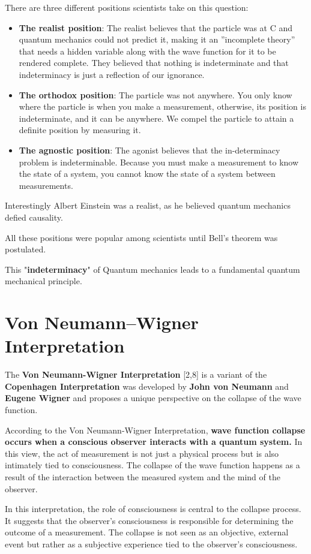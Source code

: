 \documentclass{article}
\begin{document}
There are three different positions scientists take on this question:
\begin{itemize}
\item \textbf{The realist position}: The realist believes that the particle was at C and quantum mechanics could not predict it, making it an ”incomplete theory” that needs a hidden variable along with the wave function for it to be rendered complete. They believed that nothing is indeterminate and that indeterminacy is just a reflection of our ignorance. 
\item \textbf{The orthodox position}: The particle was not anywhere. You only know where the particle is when you make a measurement, otherwise, its position is indeterminate, and it can be anywhere. We compel the particle to attain a definite position by measuring it. 
\item \textbf{The agnostic position}: The agonist believes that the in-determinacy problem is indeterminable. Because you must make a measurement to know the state of a system, you cannot know the state of a system between measurements. 
\end{itemize}
Interestingly Albert Einstein was a realist, as he believed quantum mechanics defied causality.

All these positions were popular among scientists until Bell's theorem was postulated.


This "\textbf{indeterminacy}" of Quantum mechanics leads to a fundamental quantum mechanical principle.


\section{\Large \textbf{Von Neumann–Wigner Interpretation}}

The \textbf{Von Neumann-Wigner Interpretation} [2,8] is a variant of the \textbf{Copenhagen Interpretation} was developed by \textbf{John von Neumann} and \textbf{Eugene Wigner} and proposes a unique perspective on the collapse of the wave function.

According to the Von Neumann-Wigner Interpretation, \textbf{wave function collapse occurs when a conscious observer interacts with a quantum system.} In this view, the act of measurement is not just a physical process but is also intimately tied to consciousness. The collapse of the wave function happens as a result of the interaction between the measured system and the mind of the observer.

In this interpretation, the role of consciousness is central to the collapse process. It suggests that the observer's consciousness is responsible for determining the outcome of a measurement. The collapse is not seen as an objective, external event but rather as a subjective experience tied to the observer's consciousness.
\end{document}

